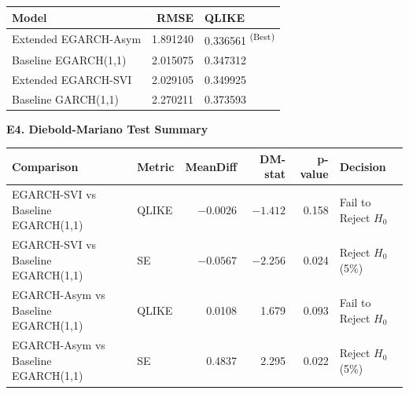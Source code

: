 \documentclass[12pt, a4paper]{article}
\begin{document}
\begin{center}
\footnotesize
\begin{tabular}{lrl}
\toprule
\textbf{Model} & \textbf{RMSE} & \textbf{QLIKE} \\
\midrule
Extended EGARCH-Asym & 1.891240 & 0.336561 \textsuperscript{(Best)} \\
Baseline EGARCH(1,1) & 2.015075 & 0.347312 \\
Extended EGARCH-SVI & 2.029105 & 0.349925 \\
Baseline GARCH(1,1) & 2.270211 & 0.373593 \\
\bottomrule
\end{tabular}
\end{center}

\vspace{6pt}
\noindent\textbf{E4. Diebold-Mariano Test Summary}

\begin{center}
\footnotesize
\begin{tabular}{llrrrl}
\toprule
\textbf{Comparison} & \textbf{Metric} & \textbf{MeanDiff} & \textbf{DM-stat} & \textbf{p-value} & \textbf{Decision} \\
\midrule
EGARCH-SVI vs Baseline EGARCH(1,1)  & QLIKE & $-0.0026$ & $-1.412$ & 0.158 & Fail to Reject $H_0$ \\
EGARCH-SVI vs Baseline EGARCH(1,1)  & SE    & $-0.0567$ & $-2.256$ & 0.024 & Reject $H_0$ (5\%) \\
EGARCH-Asym vs Baseline EGARCH(1,1) & QLIKE & 0.0108    & 1.679    & 0.093 & Fail to Reject $H_0$ \\
EGARCH-Asym vs Baseline EGARCH(1,1) & SE    & 0.4837    & 2.295    & 0.022 & Reject $H_0$ (5\%) \\
\bottomrule
\end{tabular}
\end{center}
\end{document}
